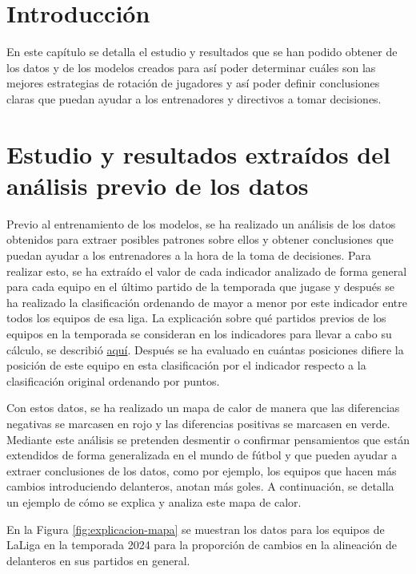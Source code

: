 
\section{Introducción}
En este capítulo se detalla el estudio y resultados que se han podido obtener de los datos y de los modelos creados para así poder determinar cuáles son las mejores estrategias de rotación de jugadores y así poder definir conclusiones claras que puedan ayudar a los entrenadores y directivos a tomar decisiones. 

\section{Estudio y resultados extraídos del análisis previo de los datos}

Previo al entrenamiento de los modelos, se ha realizado un análisis de los datos obtenidos para 
extraer posibles patrones sobre ellos y obtener conclusiones que puedan ayudar a los entrenadores a la hora de la toma de decisiones. Para realizar esto, se ha extraído el valor de cada indicador 
analizado de forma general para cada equipo en el último partido de la temporada que jugase y 
después se ha realizado la clasificación ordenando de mayor a menor por este indicador entre 
todos los equipos de esa liga. La explicación sobre qué partidos previos de los equipos en la temporada se consideran en los indicadores para llevar a cabo su cálculo, se describió \hyperlink{explicacion-indicadores}{aquí}. Después se ha evaluado en cuántas posiciones difiere la posición de 
este equipo en esta clasificación por el indicador respecto a la clasificación original ordenando 
por puntos. 

Con estos datos, se ha realizado un mapa de calor de manera que las diferencias negativas se 
marcasen en rojo y las diferencias positivas se marcasen en verde. Mediante este análisis se 
pretenden desmentir o confirmar pensamientos que están extendidos de forma generalizada en el 
mundo de fútbol y que pueden ayudar a extraer conclusiones de los datos, como por ejemplo, los 
equipos que hacen más cambios introduciendo delanteros, anotan más goles. A continuación, se detalla un ejemplo de cómo se explica y analiza este mapa de calor.

En la Figura \ref{fig:explicacion-mapa} se muestran los datos para los equipos de LaLiga en la temporada 2024 para 
la proporción de cambios en la alineación de delanteros en sus partidos en general.

